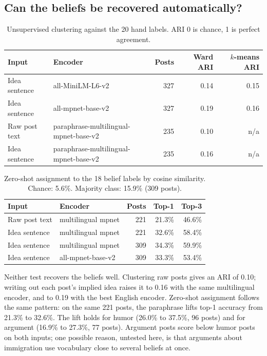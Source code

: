 \documentclass[10pt,a4paper]{article}
\begin{document}
\subsection{Can the beliefs be recovered automatically?}
\begin{table}[h]
\centering\small
\begin{tabular}{llrrr}
\toprule
Input & Encoder & Posts & Ward ARI & $k$-means ARI\\
\midrule
Idea sentence & all-MiniLM-L6-v2 & 327 & 0.14 & 0.15\\
Idea sentence & all-mpnet-base-v2 & 327 & 0.19 & 0.16\\
Raw post text & paraphrase-multilingual-mpnet-base-v2 & 235 & 0.10 & n/a\\
Idea sentence & paraphrase-multilingual-mpnet-base-v2 & 235 & 0.16 & n/a\\
\bottomrule
\end{tabular}
\caption{Unsupervised clustering against the 20 hand labels. ARI 0 is chance, 1 is perfect agreement.}
\label{tab:ari}
\end{table}

\begin{table}[h]
\centering\small
\begin{tabular}{llrrr}
\toprule
Input & Encoder & Posts & Top-1 & Top-3\\
\midrule
Raw post text & multilingual mpnet & 221 & 21.3\% & 46.6\%\\
Idea sentence & multilingual mpnet & 221 & 32.6\% & 58.4\%\\
Idea sentence & multilingual mpnet & 309 & 34.3\% & 59.9\%\\
Idea sentence & all-mpnet-base-v2 & 309 & 33.3\% & 53.4\%\\
\bottomrule
\end{tabular}
\caption{Zero-shot assignment to the 18 belief labels by cosine similarity. Chance: 5.6\%. Majority class: 15.9\% (309 posts).}
\label{tab:zeroshot}
\end{table}

Neither test recovers the beliefs well. Clustering raw posts gives an ARI of 0.10; writing out each post's implied idea raises it to 0.16 with the same multilingual encoder, and to 0.19 with the best English encoder. Zero-shot assignment follows the same pattern: on the same 221 posts, the paraphrase lifts top-1 accuracy from 21.3\% to 32.6\%. The lift holds for humor (26.0\% to 37.5\%, 96 posts) and for argument (16.9\% to 27.3\%, 77 posts). Argument posts score below humor posts on both inputs; one possible reason, untested here, is that arguments about immigration use vocabulary close to several beliefs at once.
\end{document}
